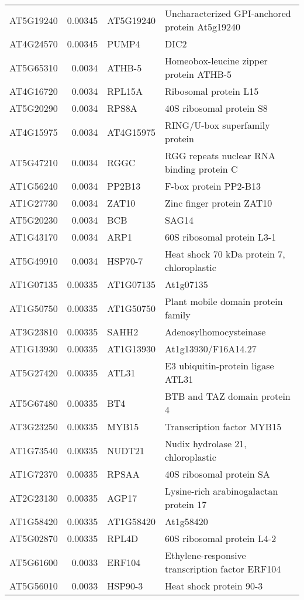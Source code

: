 \documentclass[a4paper]{article}
\begin{document}
\begin{center}
\begin{tabular}{lrll}
AT5G19240 & 0.00345 & AT5G19240 & Uncharacterized GPI-anchored protein At5g19240\\
AT4G24570 & 0.00345 & PUMP4 & DIC2\\
AT5G65310 & 0.0034 & ATHB-5 & Homeobox-leucine zipper protein ATHB-5\\
AT4G16720 & 0.0034 & RPL15A & Ribosomal protein L15\\
AT5G20290 & 0.0034 & RPS8A & 40S ribosomal protein S8\\
AT4G15975 & 0.0034 & AT4G15975 & RING/U-box superfamily protein\\
AT5G47210 & 0.0034 & RGGC & RGG repeats nuclear RNA binding protein C\\
AT1G56240 & 0.0034 & PP2B13 & F-box protein PP2-B13\\
AT1G27730 & 0.0034 & ZAT10 & Zinc finger protein ZAT10\\
AT5G20230 & 0.0034 & BCB & SAG14\\
AT1G43170 & 0.0034 & ARP1 & 60S ribosomal protein L3-1\\
AT5G49910 & 0.0034 & HSP70-7 & Heat shock 70 kDa protein 7, chloroplastic\\
AT1G07135 & 0.00335 & AT1G07135 & At1g07135\\
AT1G50750 & 0.00335 & AT1G50750 & Plant mobile domain protein family\\
AT3G23810 & 0.00335 & SAHH2 & Adenosylhomocysteinase\\
AT1G13930 & 0.00335 & AT1G13930 & At1g13930/F16A14.27\\
AT5G27420 & 0.00335 & ATL31 & E3 ubiquitin-protein ligase ATL31\\
AT5G67480 & 0.00335 & BT4 & BTB and TAZ domain protein 4\\
AT3G23250 & 0.00335 & MYB15 & Transcription factor MYB15\\
AT1G73540 & 0.00335 & NUDT21 & Nudix hydrolase 21, chloroplastic\\
AT1G72370 & 0.00335 & RPSAA & 40S ribosomal protein SA\\
AT2G23130 & 0.00335 & AGP17 & Lysine-rich arabinogalactan protein 17\\
AT1G58420 & 0.00335 & AT1G58420 & At1g58420\\
AT5G02870 & 0.00335 & RPL4D & 60S ribosomal protein L4-2\\
AT5G61600 & 0.0033 & ERF104 & Ethylene-responsive transcription factor ERF104\\
AT5G56010 & 0.0033 & HSP90-3 & Heat shock protein 90-3\\

\end{tabular}
\end{center}
\end{document}
